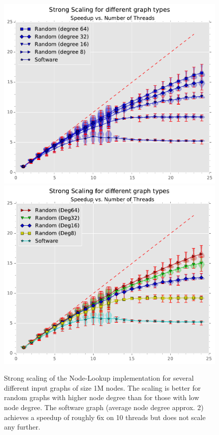\begin{figure}[ht]
	\centering
	\includegraphics[width=\columnwidth]{plots/strongscaling_gtALL_n1000000.pdf}
	\includegraphics[width=\columnwidth]{plots/strongscaling_gtALL_n1000000_multicolor.pdf}
	\caption{Strong scaling of the Node-Lookup implementation for several different input graphs of size 1M nodes. The scaling is better for random graphs with higher node degree than for those with low node degree.
		The software graph (average node degree approx. 2) achieves a speedup of roughly 6x on 10 threads but does not scale any further.
}
	\label{fig:strongscaling_graphtypes}
\end{figure}

